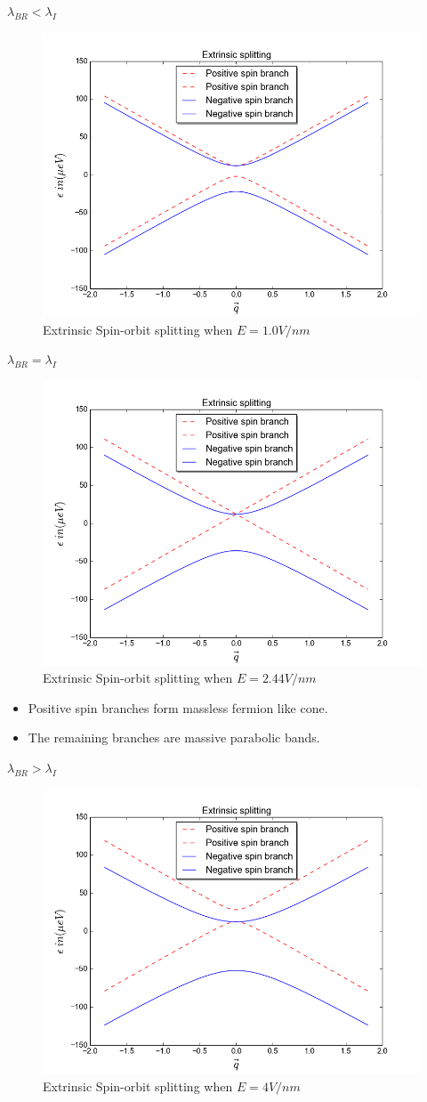 \documentclass[11pt]{beamer}
\begin{document}
\begin{frame}{$\lambda_{BR}<\lambda_I$}
\begin{figure}[h]
    \includegraphics[height=0.3\textwidth,width = .5\textwidth]{figure_2}
    \caption{Extrinsic Spin-orbit splitting when $E = 1.0 V/nm$}
\end{figure}
\end{frame}
\begin{frame}{$\lambda_{BR}=\lambda_I$}
\begin{figure}[h]
    \includegraphics[height=0.3\textwidth,width = .5\textwidth]{figure_3}
    \caption{Extrinsic Spin-orbit splitting when $E = 2.44 V/nm$}
\end{figure}
\begin{itemize}
    \item Positive spin branches form massless fermion like cone.
    \item The remaining branches are massive parabolic bands.
\end{itemize}

\end{frame}
\begin{frame}{$\lambda_{BR}>\lambda_I$}
\begin{figure}[h]
    \includegraphics[height=0.3\textwidth,width = .5\textwidth]{figure_4}
    \caption{Extrinsic Spin-orbit splitting when $E = 4 V/nm$}
\end{figure}
\end{frame}
\end{document}
